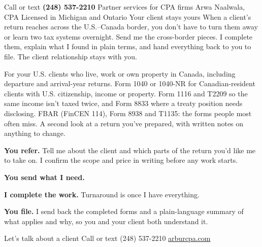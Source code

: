 \documentclass[10pt]{article}
\begin{document}
\flyerheader%
  {Call or text \textbf{(248) 537-2210}}%
  {Partner services for CPA firms}%
  {Arwa Naalwala, CPA \textbullet{} Licensed in Michigan and Ontario}%
  {Your client stays yours}%
  {When a client's return reaches across the U.S.--Canada border, you don't
   have to turn them away or learn two tax systems overnight. Send me the
   cross-border pieces. I complete them, explain what I found in plain terms,
   and hand everything back to you to file. The client relationship stays
   with you.}


\begin{services}
    {For your U.S. clients who live, work or own property in Canada, including
     departure and arrival-year returns.}
    {}
    {Form 1040 or 1040-NR for Canadian-resident clients with U.S. citizenship,
     income or property.}
    {}
    {Form 1116 and T2209 so the same income isn't taxed twice, and Form 8833
     where a treaty position needs disclosing.}
    {}
    {FBAR (FinCEN 114), Form 8938 and T1135: the forms people most often miss.}
    {}
    {A second look at a return you've prepared, with written notes on anything
     to change.}
    {}
\end{services}

{\fontsize{8.5}{11}\selectfont\color{sage}\par}


\begin{steps}
  \item \textbf{You refer.} Tell me about the client and which parts of the
    return you'd like me to take on. I confirm the scope and price in writing
    before any work starts.
  \item \textbf{You send what I need.} 
  \item \textbf{I complete the work.} Turnaround is  once
    I have everything. 
  \item \textbf{You file.} I send back the completed forms and a plain-language
    summary of what applies and why, so you and your client both understand it.
\end{steps}

\flyerfooter%
  {Let's talk about a client}%
  {Call or text (248) 537-2210\contactsep {}\contactsep
   \href{https://arburcpa.com}{arburcpa.com}}
\end{document}
